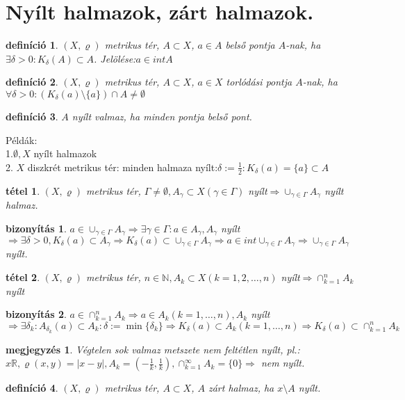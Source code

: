 \documentclass{article}
\newcommand{\R}{\mathbb{R}}
\newcommand{\N}{\mathbb{N}}
\newcommand{\nn}{\Rightarrow}
\newcommand{\di}{\displaystyle}
\theoremstyle{magyar}
\newtheorem{de}{definíció}[section]
\newtheorem{te}{tétel}[section]
\newtheorem{bi}{bizonyítás}[section]
\newtheorem{me}{megjegyzés}[section]
\begin{document}
\section{Nyílt halmazok, zárt halmazok.}
\begin{de}
  $(X,\varrho)$ metrikus tér, $A\subset X$, $a\in A$ belső pontja $A$-nak, ha $\exists\delta>0:K_\delta(A)\subset A$. Jelölése:$a\in intA$
\end{de}
\begin{de}
  $(X,\varrho)$ metrikus tér, $A\subset X$, $a\in X$ torlódási pontja $A$-nak, ha $\forall\delta>0:(K_\delta(a)\setminus\{a\})\cap A\not=\emptyset$
\end{de}
\begin{de}
  $A$ nyílt valmaz, ha minden pontja belső pont.
\end{de}
Példák:\\
1.$\emptyset,X$ nyílt halmazok\\
2. $X$ diszkrét metrikus tér: minden halmaza nyílt:$\delta:=\di\frac{1}{2}:K_\delta(a)=\{a\}\subset A$
\begin{te}
  $(X,\varrho)$ metrikus tér, $\Gamma\not=\emptyset, A_\gamma\subset X(\gamma\in\Gamma)$ nyílt$\nn\cup_{\gamma\in\Gamma}A_\gamma$ nyílt halmaz.
\end{te}
\begin{bi}
  $\di a\in\cup_{\gamma\in\Gamma}A_\gamma \nn\exists \gamma\in\Gamma:a\in A_\gamma, A_\gamma$ nyílt$\nn\exists\delta>0, K_\delta(a)\subset A_\gamma\nn K_\delta(a)\subset\cup_{\gamma\in\Gamma}A_\gamma\nn a\in int\cup_{\gamma\in\Gamma}A_\gamma\nn \cup_{\gamma\in\Gamma}A_\gamma$ nyílt.
\end{bi}
\begin{te}
  $(X,\varrho)$ metrikus tér, $n\in\N, A_k\subset X(k=1,2,\ldots,n)$ nyílt$\nn\cap_{k=1}^{n}A_k$ nyílt  
\end{te}
\begin{bi}
  $a\in\cap_{k=1}^{n}A_k\nn a\in A_k(k=1,\ldots,n), A_k$ nyílt
  $\nn\exists\delta_k:A_{\delta_k}(a)\subset A_k: \delta:=\min\{\delta_k\}\nn K_\delta(a)\subset A_k(k=1,\ldots,n)\nn K_\delta(a)\subset\cap_{k=1}^{n}A_k$
\end{bi}
\begin{me}
  Végtelen sok valmaz metszete nem feltétlen nyílt, pl.:$x\R,\varrho(x,y)=|x-y|, A_k=(-\di\frac1{k},\frac1{k}), \cap_{k=1}^\infty A_k=\{0\}\nn$ nem nyílt.
\end{me}
\begin{de}
  $(X,\varrho)$ metrikus tér, $A\subset X$, $A$ zárt halmaz, ha $x\setminus A$ nyílt.
\end{de}
\end{document}
